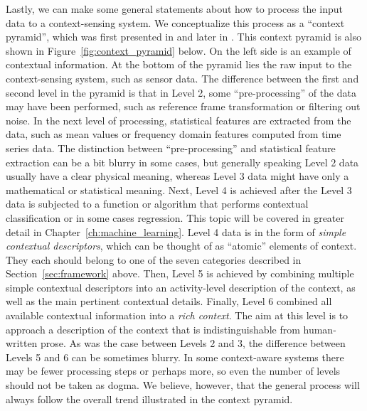 Lastly, we can make some general statements about how to process the input data to a context-sensing system. We conceptualize this process as a ``context pyramid'', which was first presented in \cite{pei2013human} and later in \cite{chen_geospatial_2014}. This context pyramid is also shown in Figure~\ref{fig:context_pyramid} below. On the left side is an example of contextual information. At the bottom of the pyramid lies the raw input to the context-sensing system, such as sensor data. The difference between the first and second level in the pyramid is that in Level 2, some ``pre-processing'' of the data may have been performed, such as reference frame transformation or filtering out noise. In the next level of processing, statistical features are extracted from the data, such as mean values or frequency domain features computed from time series data. The distinction between ``pre-processing'' and statistical feature extraction can be a bit blurry in some cases, but generally speaking Level 2 data usually have a clear physical meaning, whereas Level 3 data might have only a mathematical or statistical meaning. Next, Level 4 is achieved after the Level 3 data is subjected to a function or algorithm that performs contextual classification or in some cases regression. This topic will be covered in greater detail in Chapter~\ref{ch:machine_learning}. Level 4 data is in the form of \emph{simple contextual descriptors}, which can be thought of as ``atomic'' elements of context. They each should belong to one of the seven categories described in Section~\ref{sec:framework} above. Then, Level 5 is achieved by combining multiple simple contextual descriptors into an activity-level description of the context, as well as the main pertinent contextual details. Finally, Level 6 combined all available contextual information into a \emph{rich context}. The aim at this level is to approach a description of the context that is indistinguishable from human-written prose. As was the case between Levels 2 and 3, the difference between Levels 5 and 6 can be sometimes blurry. In some context-aware systems there may be fewer processing steps or perhaps more, so even the number of levels should not be taken as dogma. We believe, however, that the general process will always follow the overall trend illustrated in the context pyramid.
%
